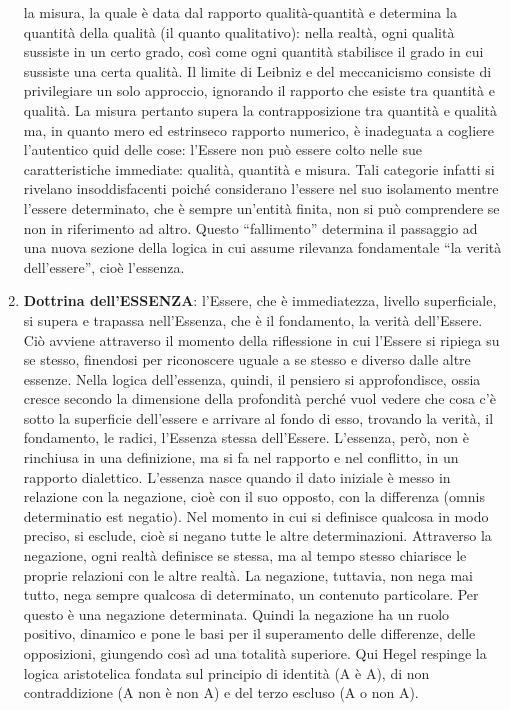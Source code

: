 \documentclass[a4paper,12pt,oneside,openany]{book}%
\begin{document}
\begin{enumerate}
	la misura, la quale è data dal rapporto qualità-quantità e determina la quantità della qualità (il quanto qualitativo): nella realtà, ogni qualità sussiste in un certo grado, così come ogni quantità stabilisce il grado in cui sussiste una certa qualità. Il limite di Leibniz e del meccanicismo consiste di privilegiare un solo approccio, ignorando il rapporto che esiste tra quantità e qualità. La misura pertanto supera la contrapposizione tra quantità e qualità ma, in quanto mero ed estrinseco rapporto numerico, è inadeguata a cogliere l’autentico quid delle cose: l’Essere non può essere colto nelle sue caratteristiche immediate: qualità, quantità e misura. Tali categorie infatti si rivelano insoddisfacenti poiché considerano l’essere nel suo isolamento mentre l’essere determinato, che è sempre un’entità finita, non si può comprendere se non in riferimento ad altro. Questo “fallimento” determina il passaggio ad una nuova sezione della logica in cui assume rilevanza fondamentale “la verità dell’essere”, cioè l’essenza.
	\item \textbf{Dottrina dell’ESSENZA}: l’Essere, che è immediatezza, livello superficiale, si supera e trapassa nell’Essenza, che è il fondamento, la verità dell’Essere. Ciò avviene attraverso il momento della riflessione in cui l’Essere si ripiega su se stesso, finendosi per riconoscere uguale a se stesso e diverso dalle altre essenze. Nella logica dell’essenza, quindi, il pensiero si approfondisce, ossia cresce secondo la dimensione della profondità perché vuol vedere che cosa c’è sotto la superficie dell’essere e arrivare al fondo di esso, trovando la verità, il fondamento, le radici, l’Essenza stessa dell’Essere. L’essenza, però, non è rinchiusa in una definizione, ma si fa nel rapporto e nel conflitto, in un rapporto dialettico. L’essenza nasce quando il dato iniziale è messo in relazione con la negazione, cioè con il suo opposto, con la differenza (omnis determinatio est negatio). Nel momento in cui si definisce qualcosa in modo preciso, si esclude, cioè si negano tutte le altre determinazioni. Attraverso la negazione, ogni realtà definisce se stessa, ma al tempo stesso chiarisce le proprie relazioni con le altre realtà. La negazione, tuttavia, non nega mai tutto, nega sempre qualcosa di determinato, un contenuto particolare. Per questo è una negazione determinata. Quindi la negazione ha un ruolo positivo, dinamico e pone le basi per il superamento delle differenze, delle opposizioni, giungendo così ad una totalità superiore. Qui Hegel respinge la logica aristotelica fondata sul principio di identità (A è A), di non contraddizione (A non è non A) e del terzo escluso (A o non A).

\end{enumerate}
\end{document}
